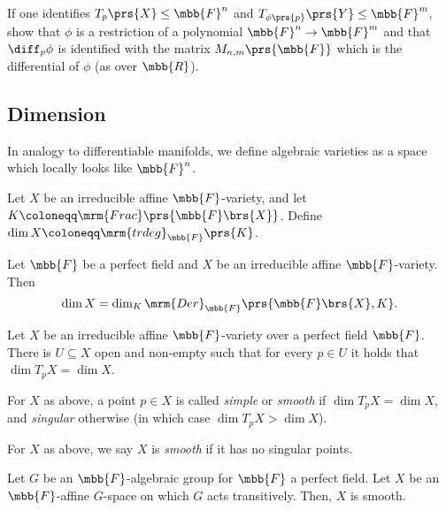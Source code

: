 \documentclass[10pt,a4paper,twoside,openany,hidelinks]{book}
\begin{document}
\begin{exercise}
If one identifies $T_p\prs{X} \leq \mbb{F}^n$ and $T_{\phi\prs{p}}\prs{Y} \leq \mbb{F}^m$, show that $\phi$ is a restriction of a polynomial $\mbb{F}^n \to \mbb{F}^m$ and that $\diff_p\phi$ is identified with the matrix $M_{n,m}\prs{\mbb{F}}$ which is the differential of $\phi$ (as over $\mbb{R}$).
\end{exercise}

\subsection{Dimension}

In analogy to differentiable manifolds, we define algebraic varieties as a space which locally looks like $\mbb{F}^n$.

\begin{definition}
Let $X$ be an irreducible affine $\mbb{F}$-variety, and let $K \coloneqq \mrm{Frac}\prs{\mbb{F}\brs{X}}$.
Define $\dim X \coloneqq \mrm{trdeg}_{\mbb{F}}\prs{K}$.
\end{definition}

\begin{fact}
Let $\mbb{F}$ be a perfect field and $X$ be an irreducible affine $\mbb{F}$-variety. Then
\[
\dim X = \dim_K \mrm{Der}_{\mbb{F}}\prs{\mbb{F}\brs{X}, K} \text{.}
\]
\end{fact}

\begin{corollary}
Let $X$ be an irreducible affine $\mbb{F}$-variety over a perfect field $\mbb{F}$.
There is $U \subseteq X$ open and non-empty such that for every $p \in U$ it holds that $\dim T_p X = \dim X$.
\end{corollary}

\begin{definition}
For $X$ as above, a point $p \in X$ is called \emph{simple} or \emph{smooth} if $\dim T_p X = \dim X$, and \emph{singular} otherwise (in which case $\dim T_p X > \dim X$).
\end{definition}

\begin{definition}
For $X$ as above, we say $X$ is \emph{smooth} if it has no singular points.
\end{definition}

\begin{proposition}
Let $G$ be an $\mbb{F}$-algebraic group for $\mbb{F}$ a perfect field.
Let $X$ be an $\mbb{F}$-affine $G$-space on which $G$ acts transitively.
Then, $X$ is smooth.
\end{proposition}
\end{document}

